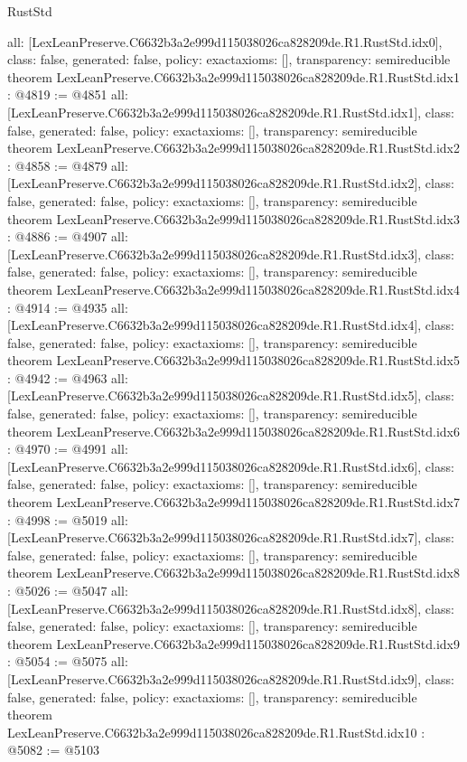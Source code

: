 \begin{lexlean}{RustStd}
\begin{coremodule}
{  all: [LexLeanPreserve.C6632b3a2e999d115038026ca828209de.R1.RustStd.idx0],
  class: false,
  generated: false,
  policy: exact{axioms: []},
  transparency: semireducible
}
theorem LexLeanPreserve.C6632b3a2e999d115038026ca828209de.R1.RustStd.idx1 : @4819 := @4851 {
  all: [LexLeanPreserve.C6632b3a2e999d115038026ca828209de.R1.RustStd.idx1],
  class: false,
  generated: false,
  policy: exact{axioms: []},
  transparency: semireducible
}
theorem LexLeanPreserve.C6632b3a2e999d115038026ca828209de.R1.RustStd.idx2 : @4858 := @4879 {
  all: [LexLeanPreserve.C6632b3a2e999d115038026ca828209de.R1.RustStd.idx2],
  class: false,
  generated: false,
  policy: exact{axioms: []},
  transparency: semireducible
}
theorem LexLeanPreserve.C6632b3a2e999d115038026ca828209de.R1.RustStd.idx3 : @4886 := @4907 {
  all: [LexLeanPreserve.C6632b3a2e999d115038026ca828209de.R1.RustStd.idx3],
  class: false,
  generated: false,
  policy: exact{axioms: []},
  transparency: semireducible
}
theorem LexLeanPreserve.C6632b3a2e999d115038026ca828209de.R1.RustStd.idx4 : @4914 := @4935 {
  all: [LexLeanPreserve.C6632b3a2e999d115038026ca828209de.R1.RustStd.idx4],
  class: false,
  generated: false,
  policy: exact{axioms: []},
  transparency: semireducible
}
theorem LexLeanPreserve.C6632b3a2e999d115038026ca828209de.R1.RustStd.idx5 : @4942 := @4963 {
  all: [LexLeanPreserve.C6632b3a2e999d115038026ca828209de.R1.RustStd.idx5],
  class: false,
  generated: false,
  policy: exact{axioms: []},
  transparency: semireducible
}
theorem LexLeanPreserve.C6632b3a2e999d115038026ca828209de.R1.RustStd.idx6 : @4970 := @4991 {
  all: [LexLeanPreserve.C6632b3a2e999d115038026ca828209de.R1.RustStd.idx6],
  class: false,
  generated: false,
  policy: exact{axioms: []},
  transparency: semireducible
}
theorem LexLeanPreserve.C6632b3a2e999d115038026ca828209de.R1.RustStd.idx7 : @4998 := @5019 {
  all: [LexLeanPreserve.C6632b3a2e999d115038026ca828209de.R1.RustStd.idx7],
  class: false,
  generated: false,
  policy: exact{axioms: []},
  transparency: semireducible
}
theorem LexLeanPreserve.C6632b3a2e999d115038026ca828209de.R1.RustStd.idx8 : @5026 := @5047 {
  all: [LexLeanPreserve.C6632b3a2e999d115038026ca828209de.R1.RustStd.idx8],
  class: false,
  generated: false,
  policy: exact{axioms: []},
  transparency: semireducible
}
theorem LexLeanPreserve.C6632b3a2e999d115038026ca828209de.R1.RustStd.idx9 : @5054 := @5075 {
  all: [LexLeanPreserve.C6632b3a2e999d115038026ca828209de.R1.RustStd.idx9],
  class: false,
  generated: false,
  policy: exact{axioms: []},
  transparency: semireducible
}
theorem LexLeanPreserve.C6632b3a2e999d115038026ca828209de.R1.RustStd.idx10 : @5082 := @5103 {
}
\end{coremodule}
\end{lexlean}
